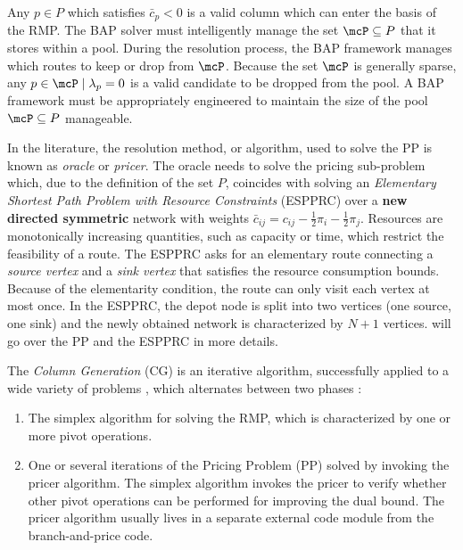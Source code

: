 Any $p \in P$ which satisfies $\bar{c}_p < 0$ is a valid column which can enter the basis of the RMP.
The BAP solver must intelligently manage the set $\mcP \subseteq P$ that it stores within a pool.
During the resolution process, the BAP framework manages which routes to keep or drop from $\mcP$.
Because the set $\mcP$ is generally sparse,
any $p \in \mcP \mid \lambda_p = 0$ is a valid candidate to be dropped from the pool.
A BAP framework must be appropriately engineered to maintain
the size of the pool $\mcP \subseteq P$ manageable.

\medskip

In the literature, the resolution method, or algorithm,
used to solve the PP is known as \textit{oracle} or \textit{pricer}.
The oracle needs to solve the pricing sub-problem which, due to the definition of the set $P$,
coincides with solving an \textit{Elementary Shortest Path Problem with Resource Constraints} (ESPPRC)
over a \textbf{new directed symmetric} network with weights
$\bar{c}_{ij} = c_{ij} - \frac{1}{2} \pi_i - \frac{1}{2} \pi_j$.
Resources are monotonically increasing quantities,
such as capacity or time,
which restrict the feasibility of a route.
The ESPPRC asks for an elementary route
connecting a \textit{source vertex} and a \textit{sink vertex}
that satisfies the resource consumption bounds.
Because of the elementarity condition, the route can only visit each vertex at most once.
In the ESPPRC, the depot node is split into two vertices (one source, one sink)
and the newly obtained network is characterized by $N + 1$ vertices.
 will go over the PP and the ESPPRC in more details.

\medskip

The \textit{Column Generation} (CG) is an iterative algorithm,
successfully applied to a wide variety of problems \parencite{desrosiers2005},
which alternates between two phases \parencite{desaulniers2018}:
\begin{enumerate}
	\setlength{\itemsep}{0pt}
	\setlength{\parskip}{0pt}

	\item The simplex algorithm for solving the RMP, which is characterized by one or more pivot operations.
	\item One or several iterations of the Pricing Problem (PP) solved by invoking the pricer algorithm.
	      The simplex algorithm invokes the pricer to verify whether other pivot operations
	      can be performed for improving the dual bound.
	      The pricer algorithm usually lives in a separate external code module from the branch-and-price code.
\end{enumerate}

